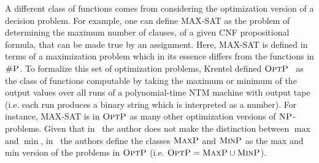 A different class of functions comes from considering the optimization version of a decision problem. For example, one can define MAX-SAT as the problem of determining the maximum number of clauses, of a given CNF propositional formula, that can be made true by an assignment. Here, MAX-SAT is defined in terms of a maximization problem which in its essence differs from the functions in $\text{\sc \#P}$. 
To formalize this set of optimization problems, Krentel defined $\text{\sc OptP}$~\cite{krentel1988complexity} as the class of functions computable by taking the maximum or minimum of the output values over all runs of a polynomial-time NTM machine with output tape (i.e. each run produces a binary string which is interpreted as a number). 
For instance, MAX-SAT is in $\text{\sc OptP}$ as many other optimization versions of $\text{\sc NP}$-problems.
Given that in~\cite{krentel1988complexity} the author does not make the distinction between $\max$ and $\min$, in~\cite{vollmer1995complexity} the authors define the classes $\text{\sc MaxP}$ and $\text{\sc MinP}$ as the max and min version of the problems in $\text{\sc OptP}$ (i.e. $\text{\sc OptP} = \text{\sc MaxP} \cup \text{\sc MinP}$).


